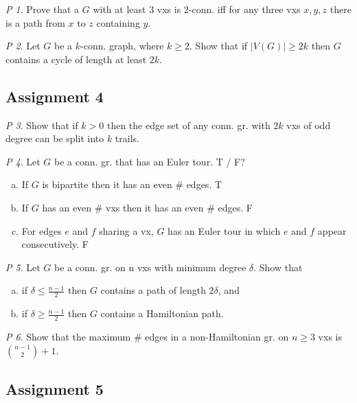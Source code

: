 \documentclass[11pt, fleqn, a4paper, landscape]{article}
\theoremstyle{plain} %
\theoremstyle{remark} %
\newtheorem{problem}{P}
\theoremstyle{definition} %
\begin{document}
\begin{multicols}{5}
\begin{problem}
Prove that a $G$ with at least 3 vxs is 2-conn. iff for any three vxs $x, y, z$ there is a path from $x$ to $z$ containing $y$.
\end{problem}

\begin{problem}
Let $G$ be a $k$-conn. graph, where $k \ge 2$. Show that if $|V (G)| \ge 2k$ then $G$ contains a cycle of length at least $2k$.
\end{problem}

\subsection{Assignment 4}

\begin{problem}
Show that if $k > 0$ then the edge set of any conn. gr. with $2k$ vxs of odd degree can be split into $k$ trails.
\end{problem}

\begin{problem}
Let $G$ be a conn. gr. that has an Euler tour. T / F?
\begin{enumerate}[(a)]
\item If $G$ is bipartite then it has an even \# edges. T
\item If $G$ has an even \# vxs then it has an even \# edges. F
\item For edges $e$ and $f$ sharing a vx, $G$ has an Euler tour in which $e$ and $f$ appear consecutively. F
\end{enumerate}
\end{problem}

\begin{problem}
Let $G$ be a conn. gr. on n vxs with minimum degree $\delta$. Show that 
\begin{enumerate}[(a)]
\item if $\delta \le \frac{n-1}{2}$ then $G$ contains a path of length $2\delta$, and
\item if $\delta \ge \frac{n-1}{2}$ then $G$ contains a Hamiltonian path.
\end{enumerate}
\end{problem}

\begin{problem}
Show that the maximum \# edges in a non-Hamiltonian gr. on $n \ge 3$
vxs is $\binom{n-1}{2}+1$.
\end{problem}

\subsection{Assignment 5}


\end{multicols}
\end{document}
